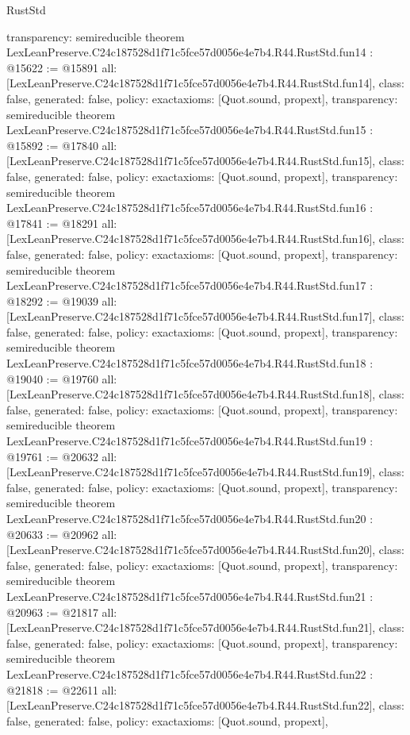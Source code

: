 \begin{lexlean}{RustStd}
\begin{coremodule}
{  transparency: semireducible
}
theorem LexLeanPreserve.C24c187528d1f71c5fce57d0056e4e7b4.R44.RustStd.fun14 : @15622 := @15891 {
  all: [LexLeanPreserve.C24c187528d1f71c5fce57d0056e4e7b4.R44.RustStd.fun14],
  class: false,
  generated: false,
  policy: exact{axioms: [Quot.sound, propext]},
  transparency: semireducible
}
theorem LexLeanPreserve.C24c187528d1f71c5fce57d0056e4e7b4.R44.RustStd.fun15 : @15892 := @17840 {
  all: [LexLeanPreserve.C24c187528d1f71c5fce57d0056e4e7b4.R44.RustStd.fun15],
  class: false,
  generated: false,
  policy: exact{axioms: [Quot.sound, propext]},
  transparency: semireducible
}
theorem LexLeanPreserve.C24c187528d1f71c5fce57d0056e4e7b4.R44.RustStd.fun16 : @17841 := @18291 {
  all: [LexLeanPreserve.C24c187528d1f71c5fce57d0056e4e7b4.R44.RustStd.fun16],
  class: false,
  generated: false,
  policy: exact{axioms: [Quot.sound, propext]},
  transparency: semireducible
}
theorem LexLeanPreserve.C24c187528d1f71c5fce57d0056e4e7b4.R44.RustStd.fun17 : @18292 := @19039 {
  all: [LexLeanPreserve.C24c187528d1f71c5fce57d0056e4e7b4.R44.RustStd.fun17],
  class: false,
  generated: false,
  policy: exact{axioms: [Quot.sound, propext]},
  transparency: semireducible
}
theorem LexLeanPreserve.C24c187528d1f71c5fce57d0056e4e7b4.R44.RustStd.fun18 : @19040 := @19760 {
  all: [LexLeanPreserve.C24c187528d1f71c5fce57d0056e4e7b4.R44.RustStd.fun18],
  class: false,
  generated: false,
  policy: exact{axioms: [Quot.sound, propext]},
  transparency: semireducible
}
theorem LexLeanPreserve.C24c187528d1f71c5fce57d0056e4e7b4.R44.RustStd.fun19 : @19761 := @20632 {
  all: [LexLeanPreserve.C24c187528d1f71c5fce57d0056e4e7b4.R44.RustStd.fun19],
  class: false,
  generated: false,
  policy: exact{axioms: [Quot.sound, propext]},
  transparency: semireducible
}
theorem LexLeanPreserve.C24c187528d1f71c5fce57d0056e4e7b4.R44.RustStd.fun20 : @20633 := @20962 {
  all: [LexLeanPreserve.C24c187528d1f71c5fce57d0056e4e7b4.R44.RustStd.fun20],
  class: false,
  generated: false,
  policy: exact{axioms: [Quot.sound, propext]},
  transparency: semireducible
}
theorem LexLeanPreserve.C24c187528d1f71c5fce57d0056e4e7b4.R44.RustStd.fun21 : @20963 := @21817 {
  all: [LexLeanPreserve.C24c187528d1f71c5fce57d0056e4e7b4.R44.RustStd.fun21],
  class: false,
  generated: false,
  policy: exact{axioms: [Quot.sound, propext]},
  transparency: semireducible
}
theorem LexLeanPreserve.C24c187528d1f71c5fce57d0056e4e7b4.R44.RustStd.fun22 : @21818 := @22611 {
  all: [LexLeanPreserve.C24c187528d1f71c5fce57d0056e4e7b4.R44.RustStd.fun22],
  class: false,
  generated: false,
  policy: exact{axioms: [Quot.sound, propext]},
}
\end{coremodule}
\end{lexlean}
